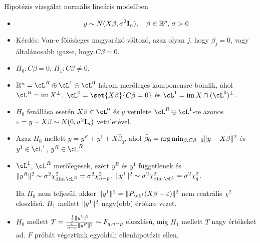 \documentclass[aspectratio=169,notheorems,9pt,\option]{beamer}\usepackage[]{graphicx}\usepackage[]{color}
\begin{document}
\begin{frame}{Hipotézis vizsgálat normális lineáris modellben}
  \begin{itemize}
    \item
    \begin{displaymath}
      y\sim N (X\beta,\sigma^2\mathbf{I}_n),\quad \beta\in\mathbb{R}^p,\,\sigma >0
    \end{displaymath}
    \item Kérdés: Van-e fölösleges magyarázó változó, azaz olyan $j$, hogy 
    $\beta_j=0$, vagy
    általánosabb igaz-e, hogy $C\beta=0$.
    \item $H_0: C\beta=0$, $H_1:C\beta\neq0$.
    \item $\real^n=\cL^R\oplus\cL^1\oplus\cL^0$ három merőleges komponensre bomlik,
    ahol $\cL^R=\im X^\perp$, $\cL^0=\set{X\beta}{C\beta=0}$ 
    és $\cL^1=\im X\cap (\cL^0)^\perp$.
    \item $H_0$ fenállása esetén $X\beta\in\cL^0$ és $y$ vetülete 
    $\cL^R\oplus\cL^1$-re azonos $\varepsilon=y-X\beta\sim N(0,\sigma^2\mathbf{I}_n)$ vetületével.
    \item Azaz $H_0$ mellett $y=y^R+y^1+X\hat\beta_0$, ahol 
    $\hat\beta_0=\arg\min_{\beta: C\beta=0}\lVert y-X\beta\rVert^2$
    és $y^1\in\cL^1$, $y^R\in\cL^R$.
    \item $\cL^1$, $\cL^R$ merőlegesek, ezért $y^R$ és $y^1$ függetlenek és 
    $\norm{y^R}^2\sim\sigma^2\chi^2_{\dim\cL^R}=\sigma^2\chi^2_{n-p}$, 
    $\norm{y^1}^2\sim\sigma^2\chi^2_{\dim\cL^1}=\sigma^2\chi^2_q$.
    
    Ha $H_0$ nem teljesül, akkor $\norm{y^1}^2= \norm{P_{\cL^1}(X\beta+\eps)}^2$ 
    nem centrális $\chi^2$ eloszlású. $H_1$ mellett $\lVert y^1\rVert^2$ nagy(obb) értékre vezet.

    \item $H_0$ mellett 
    $T=\frac{\frac{1}{q}\lVert y^1\rVert^2}{\frac{1}{n-p}\lVert y^R\rVert^2}\sim F_{q,n-p}$ eloszlású, 
    míg $H_1$ mellett $T$ nagy értékeket ad. $F$ próbát végeztünk egyoldali ellenhipotézis ellen.

  \end{itemize}
\end{frame}
\end{document}
